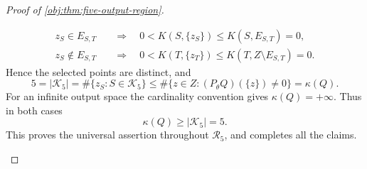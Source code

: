 \begin{proof}[Proof of \cref{obj:thm:five-output-region}]
\begin{enumerate}
\[\begin{aligned}
z_S\in E_{S,T}
&\quad\Longrightarrow\quad
0<K(S,\{z_S\})\le K(S,E_{S,T})=0,\\
z_S\notin E_{S,T}
&\quad\Longrightarrow\quad
0<K(T,\{z_T\})\le K(T,Z\setminus E_{S,T})=0.
\end{aligned}
\]
Hence the selected points are distinct, and
\[
5=|\mathcal K_5|
=\#\{z_S:S\in\mathcal K_5\}
\le\#\{z\in Z:(P_\theta Q)(\{z\})\ne0\}
=\kappa(Q).
\]
For an infinite output space the cardinality convention gives
\(\kappa(Q)=+\infty\). Thus in both cases
\[
\kappa(Q)\ge|\mathcal K_5|=5.
\]
This proves the universal assertion throughout \(\mathcal R_5\), and
completes all the claims.
\end{enumerate}
\end{proof}

